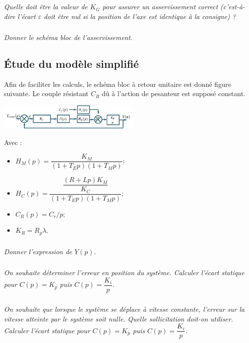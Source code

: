 \documentclass[10pt,fleqn]{article} %
\begin{document}
\begin{multicols}{2}
\subparagraph{}
\textit{Quelle doit être la valeur de $K_G$ pour assurer un asservissement correct (c'est-à-dire l'écart $\varepsilon$ doit être nul si la position de l'axe est identique à la consigne) ?}
\ifprof
\begin{corrige}
\end{corrige}
\else
\fi

\subparagraph{}
\textit{Donner le schéma bloc de l'asservissement.}
\ifprof
\begin{corrige}
\end{corrige}
\else
\fi

\subsection*{Étude du modèle simplifié}
\ifprof
\else
Afin de faciliter les calculs, le schéma bloc à retour unitaire est donné figure suivante. Le couple résistant $C_R$ dû à l'action de pesanteur est supposé constant.
 
 \begin{center}
\includegraphics[width=7cm]{images/image10}
\end{center} 


Avec :
\begin{itemize}
\item $H_M (p)=\dfrac{K_M}{(1+T_E p)(1+T_M p)}$;
\item $H_C (p)=\dfrac{\dfrac{\left(R+Lp\right)K_M}{K_C}}{(1+T_E p)(1+T_M p)}$;
\item $C_R (p)=C_r/p$;
\item $K_R=R_p \lambda$.
\end{itemize}
\fi

\subparagraph{}
\textit{Donner l'expression de $Y(p)$.}
\ifprof
\begin{corrige}
\end{corrige}
\else
\fi

\subparagraph{}
\textit{On souhaite déterminer l'erreur en position du système. Calculer l'écart statique pour $C(p)=K_p$ puis $C(p)=\dfrac{K_i}{p}$.}
\ifprof
\begin{corrige}
\end{corrige}
\else
\fi

\subparagraph{}
\textit{On souhaite que lorsque le système se déplace à vitesse constante, l'erreur sur la vitesse atteinte par le système soit nulle. Quelle sollicitation doit-on utiliser. Calculer l'écart statique pour $C(p)=K_p$ puis $C(p)=\dfrac{K_i}{p}$.}
\ifprof
\begin{corrige}
\end{corrige}
\else
\fi


\end{multicols}
\end{document}
